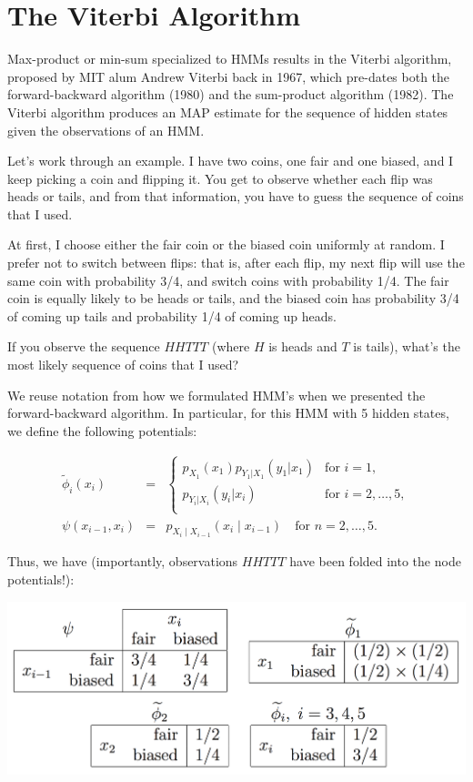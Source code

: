 \documentclass[6008notes.tex]{subfiles}
\begin{document}
\graphicspath{ {images/viterbi/} }

\section{The Viterbi Algorithm}

Max-product or min-sum specialized to HMMs results in the Viterbi algorithm, proposed by MIT alum Andrew Viterbi back in 1967, which pre-dates both the forward-backward algorithm (1980) and the sum-product algorithm (1982). The Viterbi algorithm produces an MAP estimate for the sequence of hidden states given the observations of an HMM.

Let's work through an example. I have two coins, one fair and one biased, and I keep picking a coin and flipping it. You get to observe whether each flip was heads or tails, and from that information, you have to guess the sequence of coins that I used.

At first, I choose either the fair coin or the biased coin uniformly at random. I prefer not to switch between flips: that is, after each flip, my next flip will use the same coin with probability 3/4, and switch coins with probability 1/4. The fair coin is equally likely to be heads or tails, and the biased coin has probability 3/4 of coming up tails and probability 1/4 of coming up heads.

If you observe the sequence $HHTTT$ (where $H$ is heads and $T$ is tails), what's the most likely sequence of coins that I used?

We reuse notation from how we formulated HMM's when we presented the forward-backward algorithm. In particular, for this HMM with 5 hidden states, we define the following potentials:

\begin{eqnarray*}
\widetilde{\phi}_i(x_i)
&=&\begin{cases}
   p_{X_1}(x_1)p_{Y_1|X_1}(y_1|x_1) & \text{for }i=1, \\
   p_{Y_i|X_i}(y_i|x_i) & \text{for }i=2,\dots,5, \\
   \end{cases} \\
\psi(x_{i-1}, x_i)
&=&p_{X_i \mid X_{i-1}}(x_i \mid x_{i-1})
\quad\text{for }n=2,\dots,5.
\end{eqnarray*}

Thus, we have (importantly, observations $HHTTT$ have been folded into the node potentials!):

{\centering\includegraphics[scale=0.25]{images_sec-viterbi-example1} \par}
\end{document}

